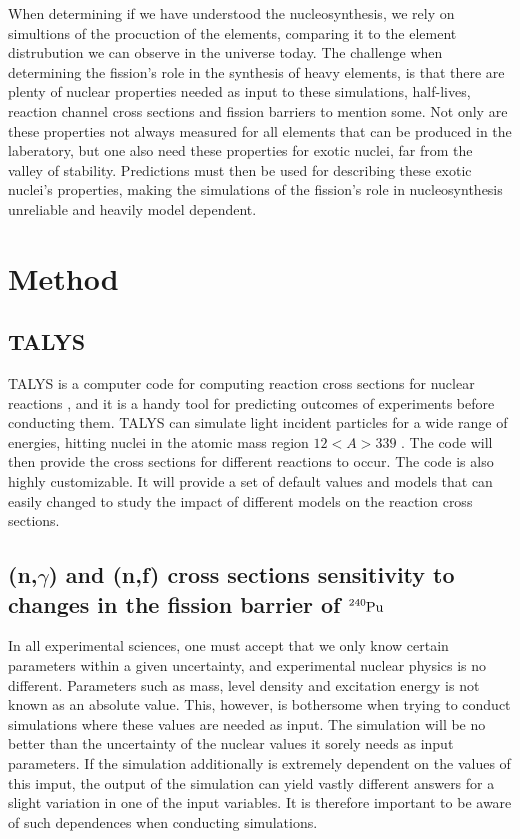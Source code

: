 \documentclass[]{article}
\begin{document}
When determining if we have understood the nucleosynthesis, we rely on simultions of the procuction of the elements, comparing it to the element distrubution we can observe in the universe today.  The challenge when determining the fission's role in the synthesis of heavy elements, is that there are plenty of nuclear properties needed as input to these simulations, half-lives, reaction channel cross sections and fission barriers to mention some. Not only are these properties not always measured for all elements that can be produced in the laberatory, but one also need these properties for exotic nuclei, far from the valley of stability. Predictions must then be used for describing these exotic nuclei's properties, making the simulations of the fission's role in nucleosynthesis unreliable and heavily model dependent. 



\section{Method}

\subsection{TALYS}

TALYS is a computer code for computing reaction cross sections for nuclear reactions \cite{TALYSmanual}, and it is a handy tool for predicting outcomes of experiments before conducting them. TALYS can simulate light incident particles for a wide range of energies, hitting nuclei in the atomic mass region $12<A>339$ \cite{TALYSmanual}. The code will then provide the cross sections for different reactions to occur. The code is also highly customizable. It will provide a set of default values and models that can easily changed to study the impact of different models on the reaction cross sections.

\subsection{(n,$\gamma$) and (n,f) cross sections sensitivity to changes in the fission barrier of $\ce{^{240}Pu}$}

In all experimental sciences, one must accept that we only know certain parameters within a given uncertainty, and experimental nuclear physics is no different. Parameters such as mass, level density and excitation energy is not known as an absolute value. This, however, is bothersome when trying to conduct simulations where these values are needed as input. The simulation will be no better than the uncertainty of the nuclear values it sorely needs as input parameters. If the simulation additionally is extremely dependent on the values of this imput, the output of the simulation can yield vastly different answers for a slight variation in one of the input variables. It is therefore important to be aware of such dependences when conducting simulations. 
\end{document}
